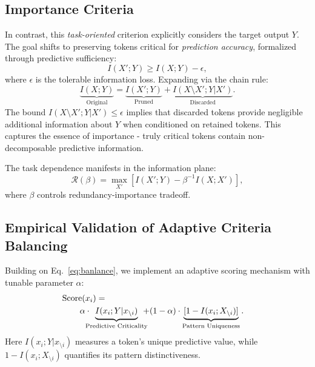 \subsection{Importance Criteria} %
\label{sec:Important_criteria}
In contrast, this \emph{task-oriented} criterion explicitly considers the target output $Y$. The goal shifts to preserving tokens critical for \emph{prediction accuracy}, formalized through predictive sufficiency: %
\begin{equation}
    I(X'; Y) \geq I(X; Y) - \epsilon,
\end{equation}
where $\epsilon$ is the tolerable information loss. Expanding via the chain rule:
\begin{equation}
    \underbrace{I(X; Y)}_{\text{Original}} = \underbrace{I(X'; Y)}_{\text{Pruned}} + \underbrace{I(X\setminus X'; Y|X')}_{\text{Discarded}}.
\end{equation}
The bound $I(X\setminus X'; Y|X') \leq \epsilon$ implies that discarded tokens provide negligible additional information about $Y$ when conditioned on retained tokens. This captures the essence of importance - truly critical tokens contain non-decomposable predictive information. %

The task dependence manifests in the information plane:
\begin{equation}
    \mathcal{R}(\beta) = \max_{X'} \left[ I(X';Y) - \beta^{-1}I(X;X') \right],
    \label{eq:banlance}
\end{equation}
where $\beta$ controls redundancy-importance tradeoff. 

\subsection{Empirical Validation of Adaptive Criteria Balancing}
\label{sec:Empirical_Validation}
Building on Eq.~\ref{eq:banlance}, we implement an adaptive scoring mechanism with tunable parameter $\alpha$: 
\begin{align}
    \text{Score}(x_i) = \nonumber \\
    &\hspace{-3em} \alpha \cdot \hspace{-0.7em}\underbrace{I(x_i; Y|x_{\setminus i})}_{\text{Predictive Criticality}} \hspace{-0.7em}+ (1-\alpha) \cdot \underbrace{[1 - I(x_i; X_{\setminus i})]}_{\text{Pattern Uniqueness}}.
    \label{eq:alpha_balance}
\end{align}
Here $I(x_i; Y|x_{\setminus i})$ measures a token's unique predictive value, while $1 - I(x_i; X_{\setminus i})$ quantifies its pattern distinctiveness.

